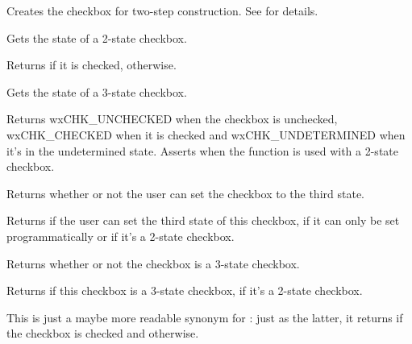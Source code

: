 Creates the checkbox for two-step construction. See \rtfsp
for details.

\label{wxcheckboxgetvalue}


Gets the state of a 2-state checkbox.


Returns \true if it is checked, \false otherwise.

\label{wxcheckboxgetthreestatevalue}


Gets the state of a 3-state checkbox.


Returns wxCHK\_UNCHECKED when the checkbox is unchecked, wxCHK\_CHECKED
 when it is checked and wxCHK\_UNDETERMINED when it's in the undetermined
state. Asserts when the function is used with a 2-state checkbox.

\label{wxcheckboxis3rdstateallowedforuser}


Returns whether or not the user can set the checkbox to the third state.


Returns \true if the user can set the third state of this checkbox, \false if it can only be set
programmatically or if it's a 2-state checkbox.

\label{wxcheckboxis3state}


Returns whether or not the checkbox is a 3-state checkbox.


Returns \true if this checkbox is a 3-state checkbox, \false if it's a 2-state checkbox.

\label{wxcheckboxischecked}


This is just a maybe more readable synonym for 
: just as the latter, it returns 
\true if the checkbox is checked and \false otherwise.

